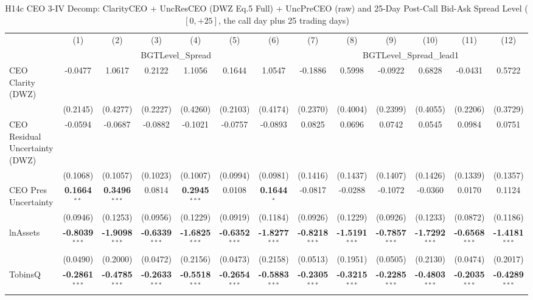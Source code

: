 \begin{landscape}
\begin{table}[H]
\setlength{\tabcolsep}{3pt}
\renewcommand{\arraystretch}{0.85}
\centering
\caption{H14c CEO 3-IV Decomp: ClarityCEO + UncResCEO (DWZ Eq.5 Full) + UncPreCEO (raw) and 25-Day Post-Call Bid-Ask Spread Level ($[0,+25]$, the call day plus 25 trading days)}
\label{tab:h14c_ceo2_decomp}
\scriptsize
\begin{tabular}{lcccccccccccc}
\toprule
 & (1) & (2) & (3) & (4) & (5) & (6) & (7) & (8) & (9) & (10) & (11) & (12) \\
 & \multicolumn{6}{c}{BGTLevel\_Spread} & \multicolumn{6}{c}{BGTLevel\_Spread\_lead1} \\
\cmidrule(lr){2-7} \cmidrule(lr){8-13}
\midrule
CEO Clarity (DWZ) & -0.0477 & 1.0617 & 0.2122 & 1.1056 & 0.1644 & 1.0547 & -0.1886 & 0.5998 & -0.0922 & 0.6828 & -0.0431 & 0.5722 \\
 & (0.2145) & (0.4277) & (0.2227) & (0.4260) & (0.2103) & (0.4174) & (0.2370) & (0.4004) & (0.2399) & (0.4055) & (0.2206) & (0.3729) \\
CEO Residual Uncertainty (DWZ) & -0.0594 & -0.0687 & -0.0882 & -0.1021 & -0.0757 & -0.0893 & 0.0825 & 0.0696 & 0.0742 & 0.0545 & 0.0984 & 0.0751 \\
 & (0.1068) & (0.1057) & (0.1023) & (0.1007) & (0.0994) & (0.0981) & (0.1416) & (0.1437) & (0.1407) & (0.1426) & (0.1339) & (0.1357) \\
CEO Pres Uncertainty & \textbf{0.1664}$^{**}$ & \textbf{0.3496}$^{***}$ & 0.0814 & \textbf{0.2945}$^{***}$ & 0.0108 & \textbf{0.1644}$^{*}$ & -0.0817 & -0.0288 & -0.1072 & -0.0360 & 0.0170 & 0.1124 \\
 & (0.0946) & (0.1253) & (0.0956) & (0.1229) & (0.0919) & (0.1184) & (0.0926) & (0.1229) & (0.0926) & (0.1233) & (0.0872) & (0.1186) \\
\midrule
lnAssets & \textbf{-0.8039}$^{***}$ & \textbf{-1.9098}$^{***}$ & \textbf{-0.6339}$^{***}$ & \textbf{-1.6825}$^{***}$ & \textbf{-0.6352}$^{***}$ & \textbf{-1.8277}$^{***}$ & \textbf{-0.8218}$^{***}$ & \textbf{-1.5191}$^{***}$ & \textbf{-0.7857}$^{***}$ & \textbf{-1.7292}$^{***}$ & \textbf{-0.6568}$^{***}$ & \textbf{-1.4181}$^{***}$ \\
 & (0.0490) & (0.2000) & (0.0472) & (0.2156) & (0.0473) & (0.2158) & (0.0513) & (0.1951) & (0.0505) & (0.2130) & (0.0474) & (0.2017) \\
TobinsQ & \textbf{-0.2861}$^{***}$ & \textbf{-0.4785}$^{***}$ & \textbf{-0.2633}$^{***}$ & \textbf{-0.5518}$^{***}$ & \textbf{-0.2654}$^{***}$ & \textbf{-0.5883}$^{***}$ & \textbf{-0.2305}$^{***}$ & \textbf{-0.3215}$^{***}$ & \textbf{-0.2285}$^{***}$ & \textbf{-0.4803}$^{***}$ & \textbf{-0.2035}$^{***}$ & \textbf{-0.4289}$^{***}$ \\

\end{tabular}
\end{table}
\end{landscape}
